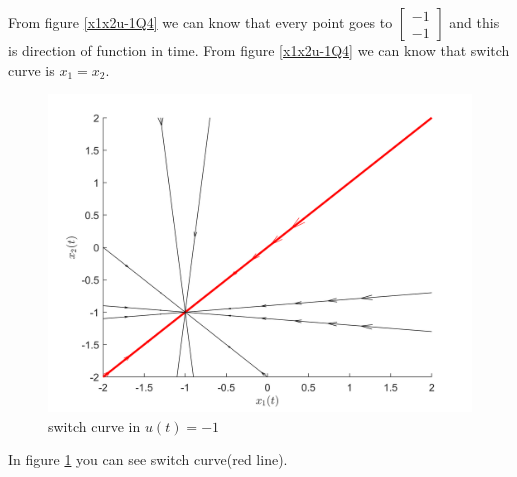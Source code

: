 \begin{itemize}
\begin{figure}[H]
\end{figure}
From figure \ref{x1x2u-1Q4} we can know that every point goes to $\begin{bmatrix}
	-1\\-1
\end{bmatrix}$ and this is direction of function in time. From figure \ref{x1x2u-1Q4} we can know that switch curve is $x_1 = x_2$.
\begin{figure}[H]
	\caption{switch curve in $u(t) = -1$}\label{x1x2u-1Q4SC}
	\centering
	\includegraphics[width=12cm]{../Code/Q4/figures/lowum1x1x2SC.png}
\end{figure}
In figure \ref{x1x2u-1Q4SC} you can see switch curve(red line).
\end{itemize}



